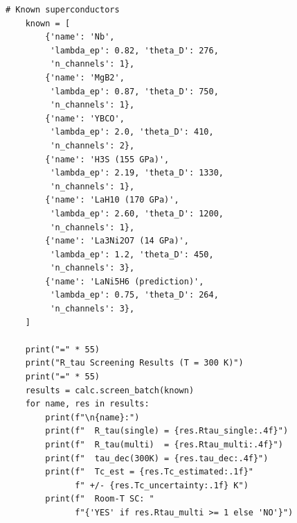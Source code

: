 \documentclass[prb,twocolumn,superscriptaddress,longbibliography,floatfix]{revtex4-2}
\begin{document}
\begin{lstlisting}[caption={rtau\_calculator.py --- $R_\tau$ screening tool.}]
    # Known superconductors
    known = [
        {'name': 'Nb',
         'lambda_ep': 0.82, 'theta_D': 276,
         'n_channels': 1},
        {'name': 'MgB2',
         'lambda_ep': 0.87, 'theta_D': 750,
         'n_channels': 1},
        {'name': 'YBCO',
         'lambda_ep': 2.0, 'theta_D': 410,
         'n_channels': 2},
        {'name': 'H3S (155 GPa)',
         'lambda_ep': 2.19, 'theta_D': 1330,
         'n_channels': 1},
        {'name': 'LaH10 (170 GPa)',
         'lambda_ep': 2.60, 'theta_D': 1200,
         'n_channels': 1},
        {'name': 'La3Ni2O7 (14 GPa)',
         'lambda_ep': 1.2, 'theta_D': 450,
         'n_channels': 3},
        {'name': 'LaNi5H6 (prediction)',
         'lambda_ep': 0.75, 'theta_D': 264,
         'n_channels': 3},
    ]

    print("=" * 55)
    print("R_tau Screening Results (T = 300 K)")
    print("=" * 55)
    results = calc.screen_batch(known)
    for name, res in results:
        print(f"\n{name}:")
        print(f"  R_tau(single) = {res.Rtau_single:.4f}")
        print(f"  R_tau(multi)  = {res.Rtau_multi:.4f}")
        print(f"  tau_dec(300K) = {res.tau_dec:.4f}")
        print(f"  Tc_est = {res.Tc_estimated:.1f}"
              f" +/- {res.Tc_uncertainty:.1f} K")
        print(f"  Room-T SC: "
              f"{'YES' if res.Rtau_multi >= 1 else 'NO'}")
\end{lstlisting}
\end{document}
